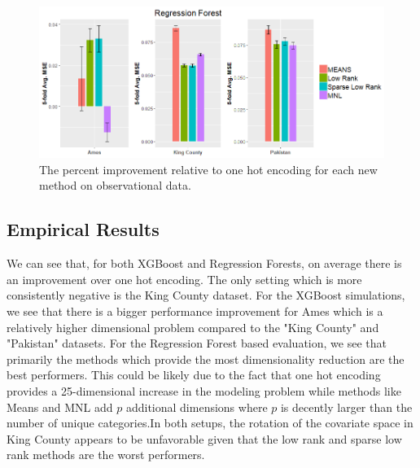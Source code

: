 \documentclass{article}
\theoremstyle{plain}
\theoremstyle{definition}
\theoremstyle{remark}
\begin{document}
\begin{figure}[htp]
  \centering
  \includegraphics[scale=0.6]{figures/rf_real_data_with_196se.png}
  \caption {The percent improvement relative to one hot encoding for each new method on observational data.}
  \label{tab:rf_sim_setups}
\end{figure}

\subsection{Empirical Results}


We can see that, for both XGBoost and Regression Forests, on average there is an improvement over one hot encoding. The only setting which is more consistently negative is the King County dataset. For the XGBoost simulations, we see that there is a bigger performance improvement for Ames which is a relatively higher dimensional problem compared to the "King County" and "Pakistan" datasets. For the Regression Forest based evaluation, we see that primarily the methods which provide the most dimensionality reduction are the best performers. This could be likely due to the fact that one hot encoding provides a 25-dimensional increase in the modeling problem while methods like Means and MNL add $p$ additional dimensions where $p$ is decently larger than the number of unique categories.In both setups, the rotation of the covariate space in King County appears to be unfavorable given that the low rank and sparse low rank methods are the worst performers.








\end{document}
